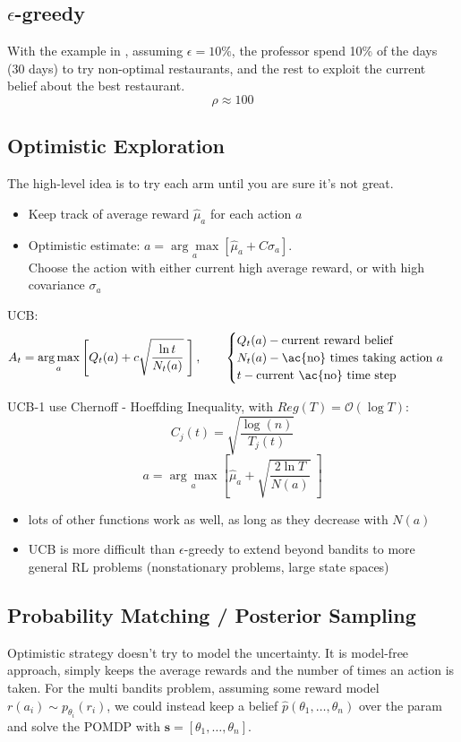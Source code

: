 \subsection{$\epsilon$-greedy}

With the example in , assuming $\epsilon = 10\%$, the professor spend 10\% of the days (30 days) to try non-optimal restaurants, and the rest to exploit the current belief about the best restaurant.
\[\rho \approx 100\]

\subsection{Optimistic Exploration}
\label{subsec:bandits-optimistic-exploration}
The high-level idea is to try each arm until you are sure it's not great.
\begin{itemize}
	\item Keep track of average reward $\widehat{\mu}_a$ for each action $a$
	\item Optimistic estimate: $a = \underset{a}{\arg\max} [\widehat{\mu}_a + C \sigma_a]$.\\
	Choose the action with either current high average reward, or with high covariance $\sigma_a$
\end{itemize}

\ac{UCB}:
\[ A_t = \underset{a}{\arg\max} \left[ Q_t(a) + c\sqrt{\frac{\ln t}{N_t(a)}}\; \right], \qquad\begin{cases}
	Q_t(a) - \text{current reward belief}\\
	N_t(a) - \text{\ac{no} times taking action $a$}\\
	t - \text{current \ac{no} time step}
\end{cases} \]

\ac{UCB}-1 use Chernoff - Hoeffding Inequality, with $Reg(T) = \mathcal{O}(\log T)$:
\[ C_j(t) = \sqrt{\frac{\log(n)}{T_j(t	)}} \]
\[ a = \underset{a}{\arg\max} \left[\widehat{\mu}_a + \sqrt{\frac{2\ln T}{N(a)}}\;\right] \]
\note
\begin{itemize}
	\item lots of other functions work as well, as long as they decrease with $N(a)$
	\item \ac{UCB} is more difficult than $\epsilon$-greedy to extend beyond bandits to more general \ac{RL} problems (nonstationary problems, large state spaces)
\end{itemize}

\subsection{Probability Matching / Posterior Sampling}
\label{subsec:bandits-posterior-sampling}
Optimistic strategy doesn't try to model the uncertainty. It is model-free approach, simply keeps the average rewards and the number of times an action is taken. For the multi bandits problem, assuming some reward model $r(a_i)\sim p_{\theta_i}(r_i)$, we could instead keep a belief $\widehat{p}(\theta_1, \dots, \theta_n)$ over the \ac{param} and solve the \ac{POMDP} with $\textbf{s} = [\theta_1, \dots, \theta_n]$.

